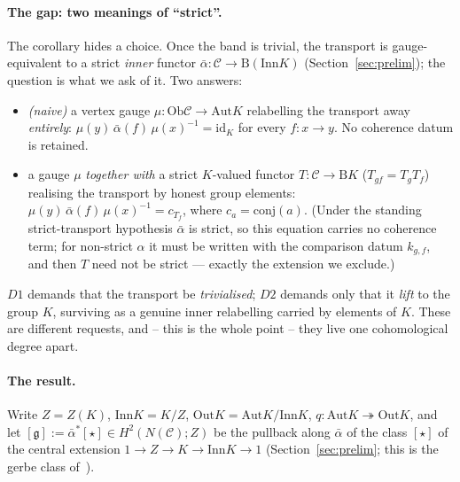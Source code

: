 \documentclass[11pt]{article}
\theoremstyle{definition}
\newcommand{\C}{\mathcal{C}}
\newcommand{\Ob}{\mathrm{Ob}}
\newcommand{\id}{\mathrm{id}}
\newcommand{\Aut}{\mathrm{Aut}}
\newcommand{\Inn}{\mathrm{Inn}}
\newcommand{\Out}{\mathrm{Out}}
\newcommand{\gerbe}{\mathfrak{g}}
\newcommand{\abar}{\bar{\alpha}}
\newcommand{\B}{\mathrm{B}}
\begin{document}
\paragraph{The gap: two meanings of ``strict''.} The corollary hides a choice. Once the
band is trivial, the transport is gauge-equivalent to a strict \emph{inner} functor
$\abar\colon\C\to\B(\Inn K)$ (Section~\ref{sec:prelim}); the question is what we ask of it.
Two answers:
\begin{itemize}
\item[\textbf{(D1)}] \emph{(naive)} a vertex gauge $\mu\colon\Ob\C\to\Aut K$ relabelling the
transport away \emph{entirely}: $\mu(y)\,\abar(f)\,\mu(x)^{-1}=\id_K$ for every $f\colon x\to y$.
No coherence datum is retained.
\item[\textbf{(D2)}] a gauge $\mu$ \emph{together with} a strict $K$-valued functor
$T\colon\C\to\B K$ ($T_{gf}=T_g T_f$) realising the transport by honest group elements:
$\mu(y)\,\abar(f)\,\mu(x)^{-1}=c_{T_f}$, where $c_a=\mathrm{conj}(a)$. (Under the standing
strict-transport hypothesis $\abar$ is strict, so this equation carries no coherence term;
for non-strict $\alpha$ it must be written with the comparison datum $k_{g,f}$, and then
$T$ need not be strict --- exactly the extension we exclude.)
\end{itemize}
$D1$ demands that the transport be \emph{trivialised}; $D2$ demands only that it \emph{lift}
to the group $K$, surviving as a genuine inner relabelling carried by elements of $K$. These
are different requests, and -- this is the whole point -- they live one cohomological degree
apart.

\paragraph{The result.} Write $Z=Z(K)$, $\Inn K=K/Z$, $\Out K=\Aut K/\Inn K$, $q\colon\Aut
K\twoheadrightarrow\Out K$, and let $[\gerbe]:=\abar^{*}[\star]\in H^2(N(\C);Z)$ be the
pullback along $\abar$ of the class $[\star]$ of the central extension $1\to Z\to K\to\Inn
K\to 1$ (Section~\ref{sec:prelim}; this is the gerbe class of~\cite{macbeth-capstone}).
\end{document}
